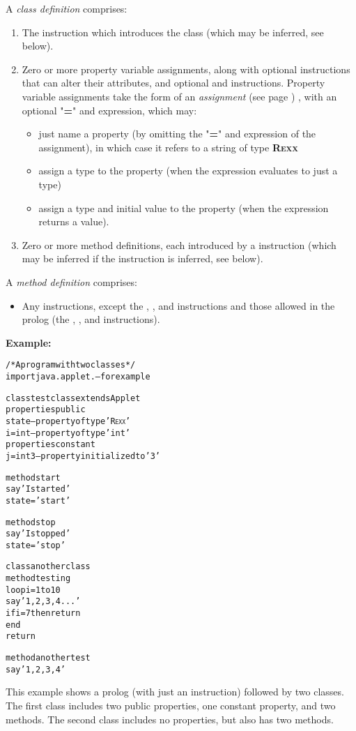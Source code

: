 A \emph{class definition} comprises:
\begin{enumerate}
\item The  instruction which introduces the class (which may
be inferred, see below).
\item 
Zero or more property variable assignments,
along with optional 
instructions that can alter their attributes, and optional
 and  instructions.
Property variable assignments take the form of an
 \emph{assignment} (see page \pageref{refassign}) , with an optional
"\textbf{=}" and expression, which may:
\begin{itemize}
\item just name a property (by omitting the "\textbf{=}"
and expression of the assignment), in which case it refers to a string of
type \textbf{R\textsc{exx}}
\item assign a type to the property (when the expression evaluates to just
a type)
\item 
assign a type and initial value to the property (when the expression
returns a value).
\end{itemize}
\item Zero or more method definitions, each introduced by a
 instruction (which may be inferred if the 
instruction is inferred, see below).
\end{enumerate}
 
A \emph{method definition} comprises:
\begin{itemize}
\item 
Any \nr{} instructions, except the , ,
and  instructions and those allowed in the prolog
(the , , and 
instructions).
\end{itemize}
 \textbf{Example:}
\begin{alltt}
/* A program with two classes */
import java.applet.   -- for example

class testclass extends Applet
  properties public
    state             -- property of type 'R\textsc{exx}'
    i=int             -- property of type 'int'
  properties constant
    j=int 3           -- property initialized to '3'

  method start
    say 'I started'
    state='start'

  method stop
    say 'I stopped'
    state='stop'

class anotherclass
  method testing
    loop i=1 to 10
      say '1, 2, 3, 4...'
      if i=7 then return
     end
    return

  method anothertest
    say '1, 2, 3, 4'
\end{alltt}
This example shows a prolog (with just an 
instruction) followed by two classes.  The first class includes
two public properties, one constant property, and two methods.
The second class includes no properties, but also has two methods.
 
